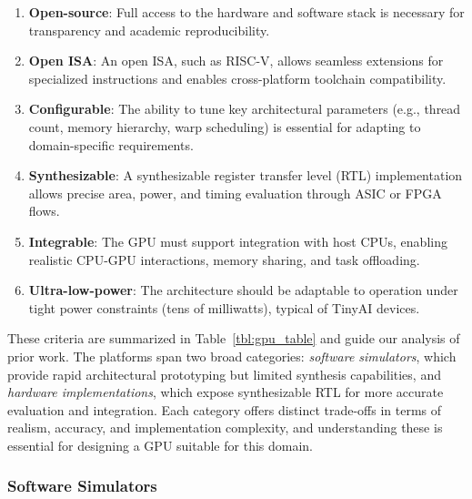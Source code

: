             \vspace{-1em}
            \begin{enumerate}
                \item \textbf{Open-source}: Full access to the hardware and software stack is necessary for transparency and academic reproducibility.
                
                \item \textbf{Open ISA}: An open ISA, such as RISC-V, allows seamless extensions for specialized instructions and enables cross-platform toolchain compatibility.
                
                \item \textbf{Configurable}: The ability to tune key architectural parameters (e.g., thread count, memory hierarchy, warp scheduling) is essential for adapting to domain-specific requirements.
                
                \item \textbf{Synthesizable}: A synthesizable register transfer level (RTL) implementation allows precise area, power, and timing evaluation through ASIC or FPGA flows.
                
                \item \textbf{Integrable}: The GPU must support integration with host CPUs, enabling realistic CPU-GPU interactions, memory sharing, and task offloading.
                
                \item \textbf{Ultra-low-power}: The architecture should be adaptable to operation under tight power constraints (tens of milliwatts), typical of TinyAI devices.
            \end{enumerate}
            \vspace{-1em}
            
            These criteria are summarized in Table~\ref{tbl:gpu_table} and guide our analysis of prior work. The platforms span two broad categories: \emph{software simulators}, which provide rapid architectural prototyping but limited synthesis capabilities, and \emph{hardware implementations}, which expose synthesizable RTL for more accurate evaluation and integration. Each category offers distinct trade-offs in terms of realism, accuracy, and implementation complexity, and understanding these is essential for designing a GPU suitable for this domain.

            \subsubsection*{Software Simulators} 
            
